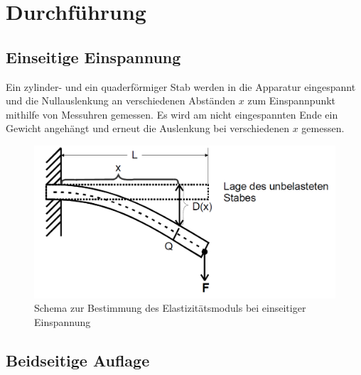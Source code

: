 \section{Durchführung}
\label{sec:Durchführung}

\subsection{Einseitige Einspannung}

Ein zylinder- und ein quaderförmiger Stab werden in die Apparatur eingespannt und die Nullauslenkung an verschiedenen Abständen $x$ zum Einspannpunkt mithilfe von Messuhren gemessen. Es wird am nicht eingespannten Ende ein Gewicht angehängt und erneut die Auslenkung bei verschiedenen $x$ gemessen.
\begin{figure}
	\centering
	\includegraphics[scale=.295]{content/images/einseitig.png}
	\caption{Schema zur Bestimmung des Elastizitätsmoduls bei einseitiger Einspannung\cite{V103}}
	\label{fig:einseitig}
\end{figure}

\subsection{Beidseitige Auflage}

